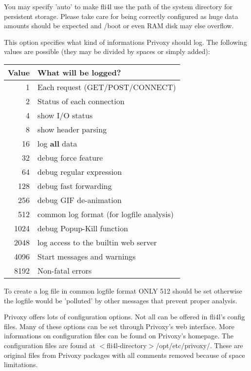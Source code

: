 \begin{description}
        You may specify 'auto' to make fli4l use the path of the system
        directory for persistent storage. Please take care for 
        being correctly configured as huge data amounts should be expected and
        /boot or even RAM disk may else overflow.


        {This option specifies what kind of informations Privoxy should log.
        The following values are possible (they may be divided by spaces or
        simply added):

        \begin{tabular}[h!]{rl}

   Value & What will be logged? \\
    \hline
    1    & Each request (GET/POST/CONNECT) \\
    2    & Status of each connection \\
    4    & show I/O status \\
    8    & show header parsing \\
    16   & log \textbf{all} data \\
    32   & debug force feature \\
    64   & debug regular expression \\
    128  & debug fast forwarding \\
    256  & debug GIF de-animation \\
    512  & common log format (for logfile analysis) \\
    1024 & debug Popup-Kill function \\
    2048 & log access to the builtin web server \\
    4096 & Start messages and warnings \\
    8192 & Non-fatal errors \\
        \end{tabular}

        To create a log file in common logfile format ONLY 512 should be
        set otherwise the logfile would be 'polluted' by other messages
        that prevent proper analysis.}

\end{description}

        Privoxy offers lots of configuration options. Not all can be
        offered in fli4l's config files. Many of these options can be
        set through Privoxy's web interface. More informations on
        configuration files can be found on Privoxy's homepage.
        The configuration files are found at
        $<$fli4l-directory$>$/opt/etc/privoxy/. These are
        original files from Privoxy packages with all comments
        removed because of space limitations.
